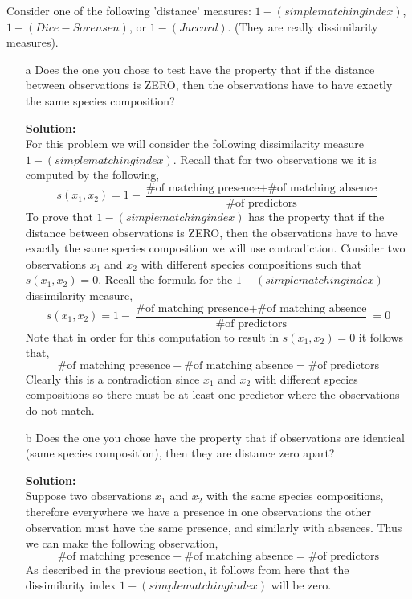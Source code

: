 \documentclass[12pt]{article}
\makeatletter
\theoremstyle{homework}
\newenvironment{exercise}[1]
{\def\@currentlabel{#1}\exercisecore}
{\endexercisecore}
\newcommand{\localhead}[1]{\par\smallskip\noindent\textbf{#1}\nobreak\\}%
\newcommand\solution{\localhead{Solution:}}
\makeatother
\begin{document}
\begin{exercise}{2}
\begin{exercise}{5} Consider one of the following 'distance' measures: $1 - (simple matching index)$, $1 - (Dice-Sorensen)$,
  or $1 - (Jaccard)$.  (They are really dissimilarity measures).\\
  \begin{enumerate}
    \item[a]  Does the one you chose to test have the property that
    if the distance between observations is ZERO, then the observations
    have to have exactly the same species composition?\\
    \solution For this problem we will consider the following dissimilarity measure $1 - (simple matching index)$. Recall that for two observations we it 
    is computed by the following, 
    \begin{equation*}
      s(x_1, x_2) = 1 - \dfrac{\text{\# of matching presence} + \text{\# of matching absence}}{\text{\# of predictors}}
    \end{equation*}
    To prove that $1 - (simple matching index)$ has the property that if the distance between observations is ZERO, then the observations
    have to have exactly the same species composition we will use contradiction. Consider two observations $x_1$ and $x_2$ with different species compositions such that 
    $s(x_1, x_2) = 0$. Recall the formula for the $1 - (simple matching index)$ dissimilarity measure,
    \begin{equation*}
      s(x_1, x_2) = 1 - \dfrac{\text{\# of matching presence} + \text{\# of matching absence}}{\text{\# of predictors}} = 0
    \end{equation*} 
    Note that in order for this computation to result in $s(x_1, x_2) = 0$ it follows that, 
    \begin{equation*}
      \text{\# of matching presence} + \text{\# of matching absence} = \text{\# of predictors}
    \end{equation*}
    Clearly this is a contradiction since $x_1$ and $x_2$ with different species compositions so there must be at least one predictor where the observations do not match.     
    \vspace{.15in}




    \item[b] Does the one you chose have the property that if observations are identical (same species composition), then they are distance zero apart?
    \solution Suppose two observations $x_1$ and $x_2$ with the same species compositions, therefore everywhere we have a presence in one observations the other observation must have the same presence, 
    and similarly with absences. Thus we can make the following observation,     
    \begin{equation*}
      \text{\# of matching presence} + \text{\# of matching absence} = \text{\# of predictors}
    \end{equation*}
    As described in the previous section, it follows from here that the dissimilarity index  $1 - (simple matching index)$ will be zero. 
  

\end{enumerate}
\end{exercise}
\end{exercise}
\end{document}
